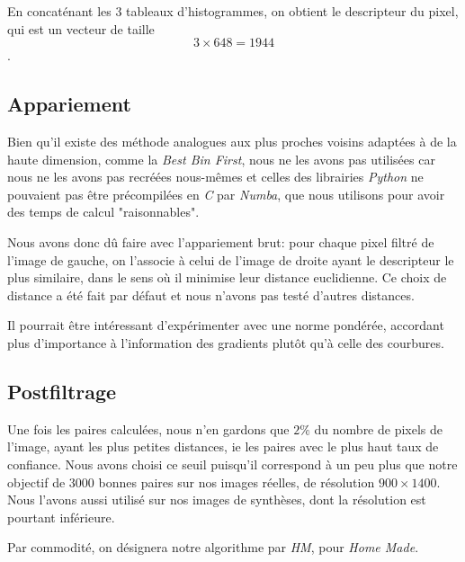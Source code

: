 \documentclass[
	a4paper, %
	10pt, %
	unnumberedsections, %
	twoside, %
]{LTJournalArticle}
\begin{document}
En concaténant les $3$ tableaux d'histogrammes, on obtient le descripteur du pixel,
qui est un vecteur de taille $$3 \times 648 = 1944$$.


\subsection{Appariement}

Bien qu'il existe des méthode analogues aux plus proches voisins adaptées à de la haute dimension,
comme la \textit{Best Bin First}, nous ne les avons pas utilisées car nous ne les avons pas
recréées nous-mêmes et celles des librairies \textit{Python} ne pouvaient pas être
précompilées en \textit{C} par \textit{Numba}, que nous utilisons pour avoir des temps
de calcul "raisonnables".

Nous avons donc dû faire avec l'appariement brut: pour chaque pixel filtré de l'image de gauche,
on l'associe à celui de l'image de droite ayant le descripteur le plus similaire,
dans le sens où il minimise leur distance euclidienne.
Ce choix de distance a été fait par défaut et nous n'avons pas testé d'autres distances.

Il pourrait être intéressant d'expérimenter avec une norme pondérée, accordant plus d'importance
à l'information des gradients plutôt qu'à celle des courbures.

\subsection{Postfiltrage}
Une fois les paires calculées, nous n'en gardons que $2 \%$ du nombre de pixels de l'image,
ayant les plus petites distances, ie les paires avec le plus haut taux
de confiance. Nous avons choisi ce seuil puisqu'il correspond à un peu plus que
notre objectif de $3000$ bonnes paires sur nos images réelles, de résolution
$900 \times 1400$.
Nous l'avons aussi
utilisé sur nos images de synthèses, dont la résolution est pourtant
inférieure.

Par commodité, on désignera notre algorithme
par \textit{HM}, pour \textit{Home Made}.

\end{document}
